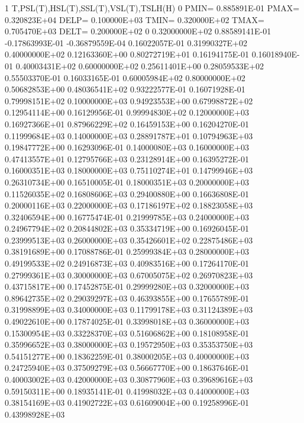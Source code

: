 \begin{DoxyVerb}1          T,PSL(T),HSL(T),SSL(T),VSL(T),TSLH(H)
0         PMIN=    0.885891E-01    PMAX=    0.320823E+04    DELP=    0.100000E+03
          TMIN=    0.320000E+02    TMAX=    0.705470E+03    DELT=    0.200000E+02
0
    0.32000000E+02    0.88589141E-01   -0.17863993E-01   -0.36879559E-04    0.16022057E-01    0.31990327E+02
    0.40000000E+02    0.12163360E+00    0.80272719E+01    0.16194175E-01    0.16018940E-01    0.40003431E+02
    0.60000000E+02    0.25611401E+00    0.28059533E+02    0.55503370E-01    0.16033165E-01    0.60005984E+02
    0.80000000E+02    0.50682853E+00    0.48036541E+02    0.93222577E-01    0.16071928E-01    0.79998151E+02
    0.10000000E+03    0.94923553E+00    0.67998872E+02    0.12954114E+00    0.16129956E-01    0.99994830E+02
    0.12000000E+03    0.16927366E+01    0.87966229E+02    0.16459153E+00    0.16204270E-01    0.11999684E+03
    0.14000000E+03    0.28891787E+01    0.10794963E+03    0.19847772E+00    0.16293096E-01    0.14000080E+03
    0.16000000E+03    0.47413557E+01    0.12795766E+03    0.23128914E+00    0.16395272E-01    0.16000351E+03
    0.18000000E+03    0.75110274E+01    0.14799946E+03    0.26310734E+00    0.16510005E-01    0.18000351E+03
    0.20000000E+03    0.11526035E+02    0.16808606E+03    0.29400880E+00    0.16636808E-01    0.20000116E+03
    0.22000000E+03    0.17186197E+02    0.18823058E+03    0.32406594E+00    0.16775474E-01    0.21999785E+03
    0.24000000E+03    0.24967794E+02    0.20844802E+03    0.35334719E+00    0.16926045E-01    0.23999513E+03
    0.26000000E+03    0.35426601E+02    0.22875486E+03    0.38191689E+00    0.17088786E-01    0.25999384E+03
    0.28000000E+03    0.49199533E+02    0.24916873E+03    0.40983516E+00    0.17264170E-01    0.27999361E+03
    0.30000000E+03    0.67005075E+02    0.26970823E+03    0.43715817E+00    0.17452875E-01    0.29999280E+03
    0.32000000E+03    0.89642735E+02    0.29039297E+03    0.46393855E+00    0.17655789E-01    0.31998899E+03
    0.34000000E+03    0.11799178E+03    0.31124389E+03    0.49022610E+00    0.17874025E-01    0.33998018E+03
    0.36000000E+03    0.15300954E+03    0.33228370E+03    0.51606862E+00    0.18108958E-01    0.35996652E+03
    0.38000000E+03    0.19572950E+03    0.35353750E+03    0.54151277E+00    0.18362259E-01    0.38000205E+03
    0.40000000E+03    0.24725940E+03    0.37509279E+03    0.56667770E+00    0.18637646E-01    0.40003002E+03
    0.42000000E+03    0.30877960E+03    0.39689616E+03    0.59150311E+00    0.18935141E-01    0.41998032E+03
    0.44000000E+03    0.38154169E+03    0.41902722E+03    0.61609004E+00    0.19258996E-01    0.43998928E+03

\end{DoxyVerb}
